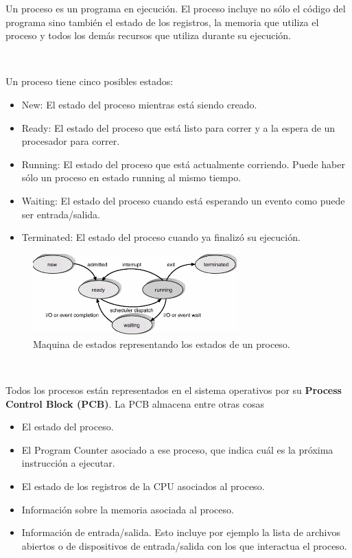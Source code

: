 \documentclass{article}
\begin{document}
Un proceso es un programa en ejecuci\'on. El proceso incluye no s\'olo el c\'odigo del programa sino tambi\'en el estado de los registros, la memoria que utiliza el proceso y todos los dem\'as recursos que utiliza durante su ejecuci\'on.

~

Un proceso tiene cinco posibles estados:
\begin{itemize}
\item New: El estado del proceso mientras est\'a siendo creado.
\item Ready: El estado del proceso que est\'a listo para correr y a la espera de un procesador para correr.
\item Running: El estado del proceso que est\'a actualmente corriendo. Puede haber s\'olo un proceso en estado running al mismo tiempo.
\item Waiting: El estado del proceso cuando est\'a esperando un evento como puede ser entrada/salida.
\item Terminated: El estado del proceso cuando ya finaliz\'o su ejecuci\'on.
\end{itemize}

\begin{figure}[H]
    \centering
    \includegraphics[width=0.7\textwidth]{imgs/process_status.png}
    \caption{Maquina de estados representando los estados de un proceso.}
    \label{fig:process_status}
\end{figure}

~

Todos los procesos est\'an representados en el sistema operativos por su \textbf{Process Control Block (PCB)}. La PCB almacena entre otras cosas
\begin{itemize}
\item El estado del proceso.
\item El Program Counter asociado a ese proceso, que indica cu\'al es la pr\'oxima instrucci\'on a ejecutar.
\item El estado de los registros de la CPU asociados al proceso.
\item Informaci\'on sobre la memoria asociada al proceso.
\item Informaci\'on de entrada/salida. Esto incluye por ejemplo la lista de archivos abiertos o de dispositivos de entrada/salida con los que interactua el proceso.
\end{itemize}
\end{document}
